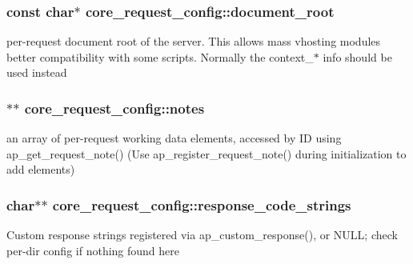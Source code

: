 \subsubsection[{\texorpdfstring{document\+\_\+root}{document_root}}]{\setlength{\rightskip}{0pt plus 5cm}const char$\ast$ core\+\_\+request\+\_\+config\+::document\+\_\+root}\hypertarget{structcore__request__config_a74d54071e954680a7559b33a79fc7b51}{}\label{structcore__request__config_a74d54071e954680a7559b33a79fc7b51}
per-\/request document root of the server. This allows mass vhosting modules better compatibility with some scripts. Normally the context\+\_\+$\ast$ info should be used instead 
\subsubsection[{\texorpdfstring{notes}{notes}}]{$\ast$$\ast$ core\+\_\+request\+\_\+config\+::notes}\hypertarget{structcore__request__config_a696e5fbd2cf5a9384e5d92b0877575fd}{}\label{structcore__request__config_a696e5fbd2cf5a9384e5d92b0877575fd}
an array of per-\/request working data elements, accessed by ID using ap\+\_\+get\+\_\+request\+\_\+note() (Use ap\+\_\+register\+\_\+request\+\_\+note() during initialization to add elements) 
\subsubsection[{\texorpdfstring{response\+\_\+code\+\_\+strings}{response_code_strings}}]{\setlength{\rightskip}{0pt plus 5cm}char$\ast$$\ast$ core\+\_\+request\+\_\+config\+::response\+\_\+code\+\_\+strings}\hypertarget{structcore__request__config_a12553976ceaa71260fc40cc5d3b41aa5}{}\label{structcore__request__config_a12553976ceaa71260fc40cc5d3b41aa5}
Custom response strings registered via ap\+\_\+custom\+\_\+response(), or N\+U\+LL; check per-\/dir config if nothing found here 
